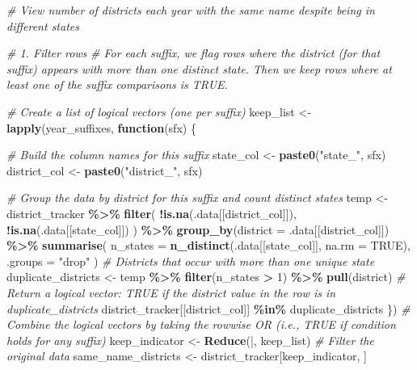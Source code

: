 \documentclass[
]{article}
\newenvironment{Shaded}{\begin{snugshade}}{\end{snugshade}}
\newcommand{\AttributeTok}[1]{\textcolor[rgb]{0.13,0.29,0.53}{#1}}
\newcommand{\CommentTok}[1]{\textcolor[rgb]{0.56,0.35,0.01}{\textit{#1}}}
\newcommand{\ConstantTok}[1]{\textcolor[rgb]{0.56,0.35,0.01}{#1}}
\newcommand{\ControlFlowTok}[1]{\textcolor[rgb]{0.13,0.29,0.53}{\textbf{#1}}}
\newcommand{\DecValTok}[1]{\textcolor[rgb]{0.00,0.00,0.81}{#1}}
\newcommand{\FunctionTok}[1]{\textcolor[rgb]{0.13,0.29,0.53}{\textbf{#1}}}
\newcommand{\NormalTok}[1]{#1}
\newcommand{\OtherTok}[1]{\textcolor[rgb]{0.56,0.35,0.01}{#1}}
\newcommand{\SpecialCharTok}[1]{\textcolor[rgb]{0.81,0.36,0.00}{\textbf{#1}}}
\newcommand{\StringTok}[1]{\textcolor[rgb]{0.31,0.60,0.02}{#1}}
\begin{document}
\begin{Shaded}
\begin{Highlighting}[]
\CommentTok{\# View number of districts each year with the same name despite being in different states}

\CommentTok{\# 1. Filter rows}
\CommentTok{\# For each suffix, we flag rows where the district (for that suffix) appears with more than one distinct state. Then we keep rows where at least one of the suffix comparisons is TRUE.}

\CommentTok{\# Create a list of logical vectors (one per suffix)}
\NormalTok{keep\_list }\OtherTok{\textless{}{-}} \FunctionTok{lapply}\NormalTok{(year\_suffixes, }\ControlFlowTok{function}\NormalTok{(sfx) \{}
  
  \CommentTok{\# Build the column names for this suffix}
\NormalTok{  state\_col }\OtherTok{\textless{}{-}} \FunctionTok{paste0}\NormalTok{(}\StringTok{"state\_"}\NormalTok{, sfx)}
\NormalTok{  district\_col }\OtherTok{\textless{}{-}} \FunctionTok{paste0}\NormalTok{(}\StringTok{"district\_"}\NormalTok{, sfx)}
  
  \CommentTok{\# Group the data by district for this suffix and count distinct states}
\NormalTok{  temp }\OtherTok{\textless{}{-}}\NormalTok{ district\_tracker }\SpecialCharTok{\%\textgreater{}\%}
    \FunctionTok{filter}\NormalTok{(}
      \SpecialCharTok{!}\FunctionTok{is.na}\NormalTok{(.data[[district\_col]]),}
      \SpecialCharTok{!}\FunctionTok{is.na}\NormalTok{(.data[[state\_col]])}
\NormalTok{    ) }\SpecialCharTok{\%\textgreater{}\%}
    \FunctionTok{group\_by}\NormalTok{(}\AttributeTok{district =}\NormalTok{ .data[[district\_col]]) }\SpecialCharTok{\%\textgreater{}\%}
    \FunctionTok{summarise}\NormalTok{(}
      \AttributeTok{n\_states =} \FunctionTok{n\_distinct}\NormalTok{(.data[[state\_col]], }\AttributeTok{na.rm =} \ConstantTok{TRUE}\NormalTok{),}
      \AttributeTok{.groups =} \StringTok{"drop"}
\NormalTok{    )}
  \CommentTok{\# Districts that occur with more than one unique state}
\NormalTok{  duplicate\_districts }\OtherTok{\textless{}{-}}\NormalTok{ temp }\SpecialCharTok{\%\textgreater{}\%}
    \FunctionTok{filter}\NormalTok{(n\_states }\SpecialCharTok{\textgreater{}} \DecValTok{1}\NormalTok{) }\SpecialCharTok{\%\textgreater{}\%}
    \FunctionTok{pull}\NormalTok{(district)}
  \CommentTok{\# Return a logical vector: TRUE if the district value in the row is in duplicate\_districts}
\NormalTok{  district\_tracker[[district\_col]] }\SpecialCharTok{\%in\%}\NormalTok{ duplicate\_districts}
\NormalTok{\})}
\CommentTok{\# Combine the logical vectors by taking the rowwise OR (i.e., TRUE if condition holds for any suffix)}
\NormalTok{keep\_indicator }\OtherTok{\textless{}{-}} \FunctionTok{Reduce}\NormalTok{(}\StringTok{\textasciigrave{}}\AttributeTok{|}\StringTok{\textasciigrave{}}\NormalTok{, keep\_list)}
\CommentTok{\# Filter the original data}
\NormalTok{same\_name\_districts }\OtherTok{\textless{}{-}}\NormalTok{ district\_tracker[keep\_indicator, ]}


\end{Highlighting}
\end{Shaded}
\end{document}

